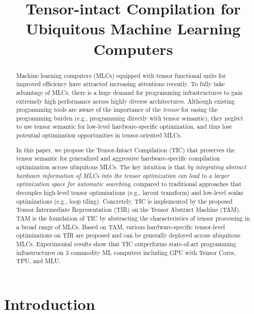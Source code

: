 \documentclass[pageno]{jpaper}
\begin{document}
\title{
Tensor-intact Compilation for Ubiquitous Machine Learning Computers}

\date{}
\maketitle

\thispagestyle{empty}

\begin{abstract}

Machine learning computers (MLCs) equipped with tensor functional units for improved efficiency have attracted increasing attentions recently. To fully take advantage of MLCs, there is a huge demand for programming infrastructures to gain extremely high performance across highly diverse architectures. Although existing programming tools are aware of the importance of the \emph{tensor} for easing the programming burden (e.g., programming directly with tensor semantic), they neglect to use tensor semantic for low-level hardware-specific optimization, and thus lose potential optimization opportunities in tensor-oriented MLCs.

In this paper, we propose the Tensor-Intact Compilation (TIC) that preserves the tensor semantic for generalized and aggressive hardware-specific compilation optimization across ubiquitous MLCs. The key intuition is that \emph{by integrating abstract hardware information of MLCs into the tensor optimization can lead to a larger optimization space for automatic searching}, compared to traditional approaches that decouples high-level tensor optimizations (e.g., layout transform) and low-level scalar optimizations (e.g., loop tiling). Concretely, TIC is implemented by the proposed Tensor Intermediate Representation (TIR) on the Tensor Abstract Machine (TAM). TAM is the foundation of TIC by abstracting the characteristics of tensor processing in a broad range of MLCs. Based on TAM, various hardware-specific tensor-level optimizations on TIR are proposed and can be generally deployed across ubiquitous MLCs. Experimental results show that TIC outperforms state-of-art programming infrastructures on 3 commodity ML computers including GPU with Tensor Cores, TPU, and MLU.
\end{abstract}

\section{Introduction}
\end{document}
